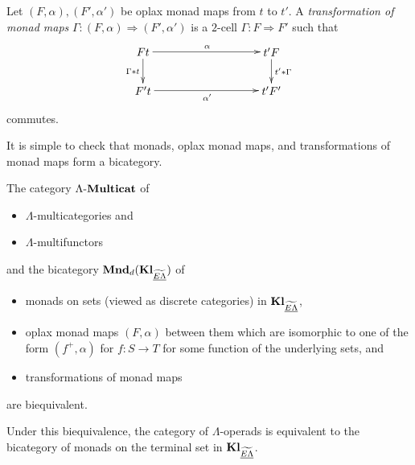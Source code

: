 \begin{Defi}
Let $(F,\alpha), (F', \alpha')$ be oplax monad maps from $t$ to $t'$. A \emph{transformation of monad maps} $\Gamma \colon (F, \alpha) \Rightarrow (F', \alpha')$ is a $2$-cell $\Gamma \colon F \Rightarrow F'$ such that
  \[
    \xy
      (0,0)*+{Ft} ="1";
      (40,0)*+{t'F} ="2";
      (40,-12)*+{t'F'} ="3";
      (0,-12)*+{F't} ="4";
      {\ar^{\alpha } "1";"2" };
      {\ar^{t' * \Gamma} "2";"3" };
      {\ar_{\Gamma * t} "1";"4" };
      {\ar_{\alpha'} "4";"3" };
    \endxy
  \]
commutes.
\end{Defi}

It is simple to check that monads, oplax monad maps, and transformations of monad maps form a bicategory.


\begin{thm}
The category $\Lambda\mbox{-}\mathbf{Multicat}$ of
\begin{itemize}
\item $\Lambda$-multicategories and
\item $\Lambda$-multifunctors
\end{itemize}
and the bicategory $\mathbf{Mnd}_{d}(\mathbf{Kl}_{\widetilde{\underline{E\Lambda}}})$ of
\begin{itemize}
\item monads on sets (viewed as discrete categories) in $\mathbf{Kl}_{\widetilde{\underline{E\Lambda}}}$,
\item oplax monad maps $(F, \alpha)$ between them which are isomorphic to one of the form $(f^{+}, \alpha)$ for $f \colon S \rightarrow T$ for some function of the underlying sets, and
\item transformations of monad maps
\end{itemize}
are biequivalent.

Under this biequivalence, the category of $\Lambda$-operads is equivalent to the bicategory of monads on the terminal set in $\mathbf{Kl}_{\widetilde{\underline{E\Lambda}}}$.
\end{thm}
